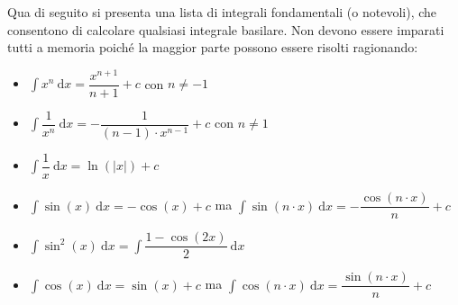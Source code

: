 \documentclass[a4paper]{article}
\begin{document}
	Qua di seguito si presenta una lista di integrali fondamentali (o notevoli), che consentono di calcolare qualsiasi integrale basilare. Non devono essere imparati tutti a memoria poiché la maggior parte possono essere risolti ragionando:
	\begin{itemize}
		\item $\displaystyle\int x^{n} \: \mathrm{d}x = \dfrac{x^{n+1}}{n+1}+c$ \hspace{1em} con $n \ne -1$

		\item $\displaystyle\int \dfrac{1}{x^{n}} \: \mathrm{d}x = - \dfrac{1}{\left(n-1\right) \cdot x^{n-1}} + c$ \hspace{1em} con $n \ne 1$

		\item $\displaystyle\int \dfrac{1}{x} \: \mathrm{d}x = \ln\left(|x|\right) + c$

		\item $\displaystyle\int \sin\left(x\right) \: \mathrm{d}x = -\cos\left(x\right) + c$ \hspace{.5em} ma \hspace{.5em} $\displaystyle\int \sin\left(n \cdot x\right) \: \mathrm{d}x = -\dfrac{\cos\left(n\cdot x\right)}{n} + c$
		
		\item $\displaystyle\int \sin^{2}\left(x\right) \: \mathrm{d}x = \int\dfrac{1-\cos\left(2x\right)}{2} \:\mathrm{d}x$

		\item $\displaystyle\int \cos\left(x\right) \: \mathrm{d}x = \sin\left(x\right) + c$ \hspace{.5em} ma \hspace{.5em} $\displaystyle\int \cos\left(n \cdot x\right) \: \mathrm{d}x = \dfrac{\sin\left(n \cdot x\right)}{n} + c$
	\end{itemize}
\end{document}
